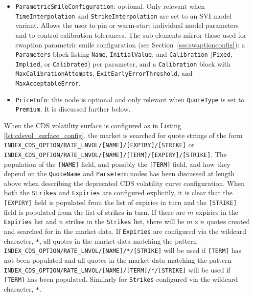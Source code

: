 \begin{itemize}
\item
\lstinline!ParametricSmileConfiguration!: optional. Only relevant when \lstinline!TimeInterpolation! and \lstinline!StrikeInterpolation! are set to an SVI model variant. Allows the user to pin or warm-start individual model parameters and to control calibration tolerances. The sub-elements mirror those used for swaption parametric smile configuration (see Section~\ref{sss:swaptionconfig}): a \lstinline!Parameters! block listing \lstinline!Name!, \lstinline!InitialValue!, and \lstinline!Calibration! (\lstinline!Fixed!, \lstinline!Implied!, or \lstinline!Calibrated!) per parameter, and a \lstinline!Calibration! block with \lstinline!MaxCalibrationAttempts!, \lstinline!ExitEarlyErrorThreshold!, and \lstinline!MaxAcceptableError!.

\item
\lstinline!PriceInfo!: this node is optional and only relevant when \lstinline!QuoteType! is set to \lstinline!Premium!.
It is discussed further below.

\end{itemize}

When the CDS volatility surface is configured as in Listing \ref{lst:cdsvol_surface_config}, 
the market is searched for quote strings of the form \lstinline!INDEX_CDS_OPTION/RATE_LNVOL/[NAME]/[EXPIRY]/[STRIKE]! 
or \lstinline!INDEX_CDS_OPTION/RATE_LNVOL/[NAME]/[TERM]/[EXPIRY]/[STRIKE]!.
The population of the \lstinline![NAME]! field, and possibly the \lstinline![TERM]! field, 
and how they depend on the \lstinline!QuoteName! and \lstinline!ParseTerm! nodes has been discussed at length above 
when describing the deprecated CDS volatility curve configuration. 
When both the \lstinline!Strikes! and \lstinline!Expiries! are configured explicitly, 
it is clear that the \lstinline![EXPIRY]! field is populated from the list of expiries in turn 
and the \lstinline![STRIKE]! field is populated from the list of strikes in turn. 
If there are $m$ expiries in the \lstinline!Expiries! list and $n$ strikes in the \lstinline!Strikes! list, 
there will be $m \times n$ quotes created and searched for in the market data. 
If \lstinline!Expiries! are configured via the wildcard character, \lstinline!*!, 
all quotes in the market data matching the pattern \lstinline!INDEX_CDS_OPTION/RATE_LNVOL/[NAME]/*/[STRIKE]! 
will be used if \lstinline![TERM]! has not been populated and all quotes in the market data matching 
the pattern \lstinline!INDEX_CDS_OPTION/RATE_LNVOL/[NAME]/[TERM]/*/[STRIKE]! will be used 
if \lstinline![TERM]! has been populated. 
Similarly for \lstinline!Strikes! configured via the wildcard character, \lstinline!*!.

